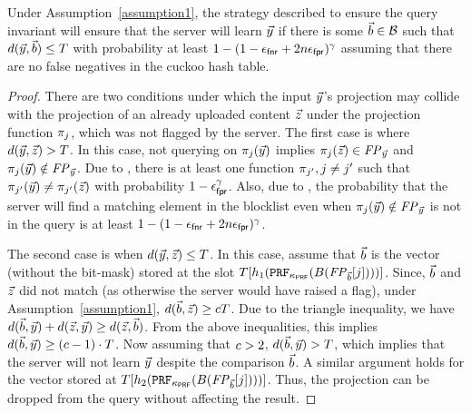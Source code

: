 \begin{theorem}
\label{thm:fnr}
Under Assumption~\ref{assumption1}, the strategy described to ensure the query invariant will ensure that the server will learn $\clientVec$ if there is some $\blocklistVec \in \blocklist$ such that $\hammingDist{\clientVec}{\blocklistVec} \le \threshold$ with probability at least $1 - (1 - \epsilon_\mathsf{fnr} + 2n \epsilon_\mathsf{fpr})^{\gamma}$ assuming that there are no false negatives in the cuckoo hash table. 
\end{theorem}




\begin{proof}
There are two conditions under which the input $\clientVec$'s projection may collide with the projection of an already uploaded content $\genericVec$ under the projection function $\projFn[\projIdx]$, which was not flagged by the server. The first case is where $\hammingDist{\clientVec}{\genericVec} > \threshold$. In this case, not querying on $\projFn[\projIdx](\clientVec)$ implies $\projFn[\projIdx](\genericVec) \in \fingerprint{\clientVec}$ and $\projFn[\projIdx](\clientVec) \notin \fingerprint{\clientVec}$. Due to , there is at least one function $\projFn[\projIdx'], \projIdx \neq \projIdx'$ such that $\projFn[\projIdx'](\clientVec) \neq \projFn[\projIdx'](\genericVec)$ with probability $1 - \epsilon_\mathsf{fpr}^{\gamma}$. Also, due to , the probability that the server will find a matching element in the blocklist even when $\projFn[\projIdx](\clientVec) \notin \fingerprint{\clientVec}$ is not in the query is at least  $1 - (1 - \epsilon_\mathsf{fnr} + 2n \epsilon_\mathsf{fpr})^{\gamma}$. 

The second case is when $\hammingDist{\clientVec}{\genericVec} \le \threshold$. In this case, assume that $\blocklistVec$ is the vector (without the bit-mask) stored at the slot $\cuckooTable[\hashFn{1}(\prf{\prfKey}(\blindingScheme(\fingerprint{\blocklistVec}[\projIdx])))]$. Since, $\blocklistVec$ and $\genericVec$ did not match (as otherwise the server would have raised a flag), under Assumption~\ref{assumption1}, $\hammingDist{\blocklistVec}{\genericVec} \ge \lshConst \threshold$. Due to the triangle inequality, we have $\hammingDist{\blocklistVec}{\clientVec} + \hammingDist{\genericVec}{\clientVec} \ge \hammingDist{\genericVec}{\blocklistVec}$. From the above inequalities, this implies $\hammingDist{\blocklistVec}{\clientVec} \ge (\lshConst - 1) \cdot \threshold$. Now assuming that $c > 2$, $\hammingDist{\blocklistVec}{\clientVec} > \threshold$, which implies that the server will not learn $\clientVec$ despite the comparison $\blocklistVec$. A similar argument holds for the vector stored at $\cuckooTable[\hashFn{2}(\prf{\prfKey}(\blindingScheme(\fingerprint{\blocklistVec}[\projIdx])))]$. Thus, the projection can be dropped from the query without affecting the result. 
\end{proof}
\fi


